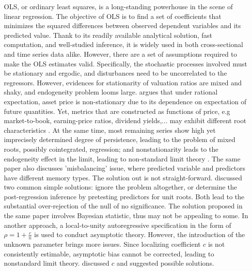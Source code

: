 \documentclass[12pt,a4paper]{article}
\begin{document}
OLS, or ordinary least squares, is a long-standing powerhouse in the scene of linear regression. The objective of OLS is to find a set of coefficients that minimizes the squared differences between observed dependent variables and its predicted value. Thank to its readily available analytical solution, fast computation, and well-studied inference, it is widely used in both cross-sectional and time series data alike. However, there are a set of assumptions required to make the OLS estimates valid. Specifically, the stochastic processes involved must be stationary and ergodic, and disturbances need to be uncorrelated to the regressors. However, evidences for stationarity of valuation ratios are mixed and shaky, and endogeneity problem looms large. \cite{roll2002rational} argues that under rational expectation, asset price is non-stationary due to its dependence on expectation of future quantities. Yet, metrics that are constructed as functions of price, e.g market-to-book, earning-price ratios, dividend yields,... may exhibit different root characteristics \citep{phillips2015halbert}. At the same time, most remaining series show high yet imprecisely determined degree of persistence, leading to the problem of mixed roots, possibly cointegrated, regression; and nonstationarity leads to the endogeneity effect in the limit, leading to non-standard limit theory \citep{phillips2015halbert}. The same paper also discusses 'misbalancing' issue, where predicted variable and predictors have different memory types. The solution out is not straight-forward. \cite{elliott1994inference} discussed two common simple solutions: ignore the problem altogether, or determine the post-regression inference by pretesting predictors for unit roots. Both lead to the substantial over-rejection of the null of no significance. The solution proposed in the same paper involves Bayesian statistic, thus may not be appealing to some. In another approach, a local-to-unity autoregressive specification in the form of $ \rho = 1 + \frac{c}{n} $ is used to conduct asymptotic theory. However, the introduction of the unknown parameter brings more issues. Since localizing coefficient $c$ is not consistently estimable, asymptotic bias cannot be corrected, leading to nonstandard limit theory. \cite{phillips2013predictive} discussed $c$ and suggested possible solutions.
\end{document}
